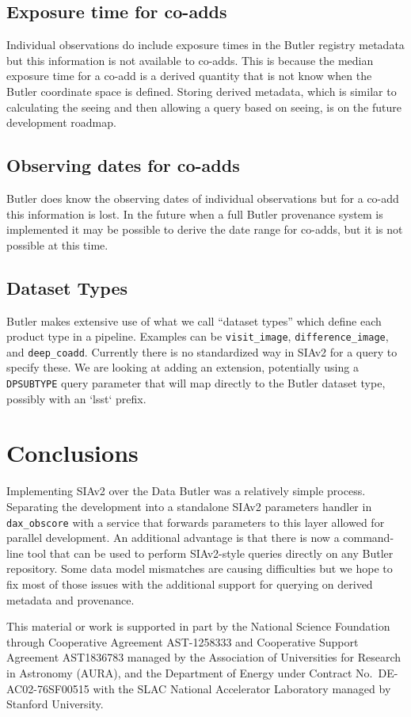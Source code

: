 \documentclass[11pt,twoside]{article}
\begin{document}
\subsection{Exposure time for co-adds}

Individual observations do include exposure times in the Butler registry metadata but this information is not available to co-adds.
This is because the median exposure time for a co-add is a derived quantity that is not know when the Butler coordinate space is defined.
Storing derived metadata, which is similar to calculating the seeing and then allowing a query based on seeing, is on the future development roadmap.

\subsection{Observing dates for co-adds}

Butler does know the observing dates of individual observations but for a co-add this information is lost.
In the future when a full Butler provenance system is implemented it may be possible to derive the date range for co-adds, but it is not possible at this time.

\subsection{Dataset Types}

Butler makes extensive use of what we call ``dataset types'' which define each product type in a pipeline.
Examples can be \texttt{visit\_image}, \texttt{difference\_image}, and \texttt{deep\_coadd}.
Currently there is no standardized way in SIAv2 for a query to specify these.
We are looking at adding an extension, potentially using a \texttt{DPSUBTYPE} query parameter that will map directly to the Butler dataset type, possibly with an `lsst` prefix.

\section{Conclusions}

Implementing SIAv2 over the Data Butler was a relatively simple process.
Separating the development into a standalone SIAv2 parameters handler in \texttt{dax\_obscore} with a service that forwards parameters to this layer allowed for parallel development.
An additional advantage is that there is now a command-line tool that can be used to perform SIAv2-style queries directly on any Butler repository.
Some data model mismatches are causing difficulties but we hope to fix most of those issues with the additional support for querying on derived metadata and provenance.

\acknowledgments This material or work is supported in part by the National Science Foundation through Cooperative Agreement AST-1258333 and Cooperative Support Agreement AST1836783 managed by the Association of Universities for Research in Astronomy (AURA), and the Department of Energy under Contract No.\ DE-AC02-76SF00515 with the SLAC National Accelerator Laboratory managed by Stanford University.


\end{document}
